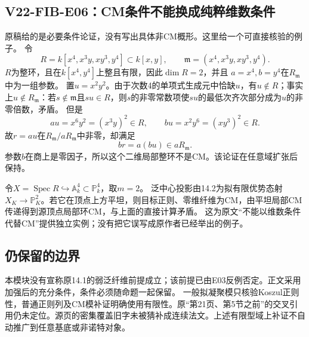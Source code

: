 \subsection*{V22-FIB-E06：CM条件不能换成纯粹维数条件}

原稿给的是必要条件论证，没有写出具体非CM概形。这里给一个可直接核验的例子。
令
\[
R=k[x^4,x^3y,xy^3,y^4]\subset k[x,y],
\qquad
\mathfrak m=(x^4,x^3y,xy^3,y^4).
\]
$R$为整环，且在$k[x^4,y^4]$上整且有限，因此$\dim R=2$，并且
$a=x^4,b=y^4$在$R_\mathfrak m$中为一组参数。
置$u=x^2y^2$。由于次数4的单项式生成元中恰缺$u$，有$u\notin R$；事实上$u\notin R_\mathfrak m$：若$s\notin\mathfrak m$且$su\in R$，则$s$的非零常数项使$su$的最低次齐次部分成为$u$的非零倍数，矛盾。
但是
\[
au=x^6y^2=(x^3y)^2\in R,\qquad
bu=x^2y^6=(xy^3)^2\in R.
\]
故$r=au$在$R_\mathfrak m/aR_\mathfrak m$中非零，却满足
\[
br=a(bu)\in aR_\mathfrak m.
\]
参数$b$在商上是零因子，所以这个二维局部整环不是CM。该论证在任意域扩张后保持。

令$X=\operatorname{Spec}R\hookrightarrow\mathbb A^4_k\subset\mathbb P^4_k$，取$m=2$。
泛中心投影由14.2为拟有限优势态射$X_K\to\mathbb P^2_K$。若它在顶点上方平坦，则目标正则、零维纤维为CM，由平坦局部CM传递得到源顶点局部环CM，与上面的直接计算矛盾。
这为原文“不能以维数条件代替CM”提供独立实例；没有把它误写成原作者已经举出的例子。

\subsection*{仍保留的边界}

本模块没有宣称原14.1的弱泛纤维前提成立；该前提已由E03反例否定。正文采用加强后的充分条件，条件必须随命题一起保留。
一般拟凝聚模只核验Koszul正则性，普通正则列及CM模补证明确使用有限性。原“第21页、第5节之前”的交叉引用仍未定位。源页的密集覆盖旧字未被猜补成连续法文。上述有限型域上补证不自动推广到任意基底或非诺特对象。

